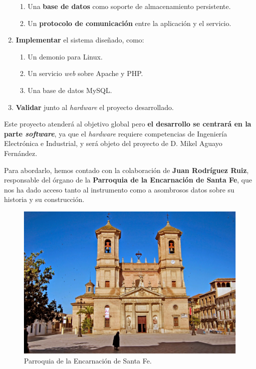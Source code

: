\begin{enumerate}
\begin{enumerate}
		\item Una \textbf{base de datos} como soporte de almacenamiento persistente.
		\item Un \textbf{protocolo de comunicación} entre la aplicación y el servicio.
	\end{enumerate}
	
	\item \textbf{Implementar} el sistema diseñado, como:
	
	\begin{enumerate}
		\item Un demonio para Linux.
		\item Un servicio \textit{web} sobre Apache y \acrshort{PHP}.
		\item Una base de datos MySQL.
	\end{enumerate}
	
	\item \textbf{Validar} junto al \textit{hardware} el proyecto desarrollado.
\end{enumerate}

Este proyecto atenderá al objetivo global pero \textbf{el desarrollo se centrará en la parte \textit{software}}, ya que el \textit{hardware} requiere competencias de Ingeniería Electrónica e Industrial, y será objeto del proyecto de D. Mikel Aguayo Fernández.

Para abordarlo, hemos contado con la colaboración de \textbf{Juan Rodríguez Ruiz}, responsable del órgano de la \textbf{Parroquia de la Encarnación de Santa Fe}, que nos ha dado acceso tanto al instrumento como a asombrosos datos sobre su historia y su construcción.

\smallskip

\begin{figure}[H]
\noindent \begin{centering}
\includegraphics[width=\linewidth]{capitulo1/figura11}
\par\end{centering}
\smallskip
\caption[Parroquia de la Encarnación de Santa Fe.]{\label{fig:figura11} Parroquia de la Encarnación de Santa Fe. \cite{iglesias_granada}}
\end{figure}

